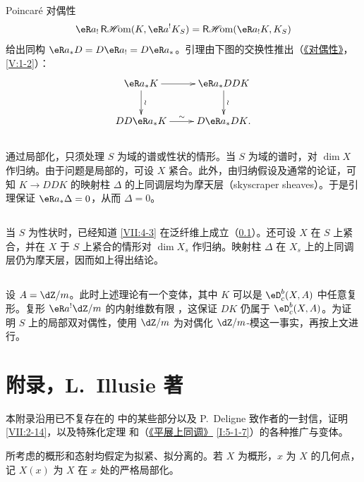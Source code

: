 Poincaré 对偶性
\[
  \eR a_! \rHom(K,\eR a^! K_S) = \rHom(\eR a_! K,K_S)
\]
给出同构 $\eR a_\ast D = D \eR a_! = D \eR a_\ast$。引理由下图的交换性推出（\hyperref[V]{《对偶性》}，\ref{V:1-2}）：
\[\xymatrix{
  \eR a_\ast K \ar[r] \ar[d]^-\wr
    & \eR a_\ast D D K \ar[d]^-\wr \\
  D D \eR a_\ast K \ar[r]^-\sim
    & D \eR a_\ast D K \text{.}
}\]

\subsection{}\label{VII:4-5}

通过局部化，只须处理 $S$ 为域的谱或性状的情形。当 $S$ 为域的谱时，对 $\dim X$ 作归纳。由于问题是局部的，可设 $X$ 紧合。此外，由归纳假设及通常的论证，可知 $K\to D D K$ 的映射柱 $\Delta$ 的上同调层均为摩天层（skyscraper sheaves）。于是引理保证 $\eR a_\ast \Delta=0$，从而 $\Delta=0$。

\subsection{}\label{VII:4-6}

当 $S$ 为性状时，已经知道 \ref{VII:4-3} 在泛纤维上成立（\ref{VII:4-5}）。还可设 $X$ 在 $S$ 上紧合，并在 $X$ 于 $S$ 上紧合的情形对 $\dim{X_s}$ 作归纳。映射柱 $\Delta$ 在 $X_s$ 上的上同调层仍为摩天层，因而如上得出结论。

\subsection{}\label{VII:4-7}

设 $A=\dZ/m$。此时上述理论有一个变体，其中 $K$ 可以是 $\eD_c^b(X,A)$ 中任意复形。复形 $\eR a^! \dZ/m$ 的内射维数有限 \cite[XVIII 3.1.7]{sga4}，这保证 $D K$ 仍属于 $\eD_c^b(X,A)$。为证明 $S$ 上的局部双对偶性，使用 $\dZ/m$ 为对偶化 $\dZ/m$-模这一事实，再按上文进行。

\section{附录，L.\ Illusie 著}\label{VII:5}

本附录沿用已不复存在的 \cite[II]{sga5} 中的某些部分以及 P.\ Deligne 致作者的一封信，证明 \ref{VII:2-14}，以及特殊化定理 \cite[XVI 2.1]{sga4} 和（\hyperref[I]{《平展上同调》} \ref{I:5-1-7}）的各种推广与变体。

所考虑的概形和态射均假定为拟紧、拟分离的。若 $X$ 为概形，$x$ 为 $X$ 的几何点，记 $X(x)$ 为 $X$ 在 $x$ 处的严格局部化。

